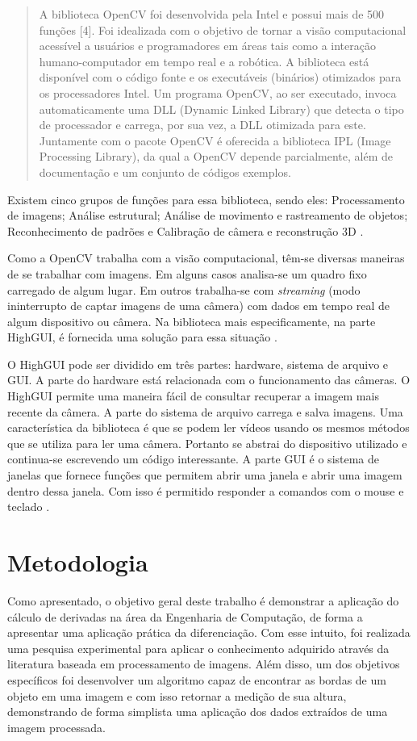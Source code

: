 \documentclass[12pt]{article}
\begin{document}
	\begin{quote}
		A biblioteca OpenCV foi desenvolvida pela Intel e possui mais de 500 funções [4]. Foi idealizada com o objetivo de tornar a visão computacional acessível a usuários e programadores em áreas tais como a interação humano-computador em tempo real e a robótica. A biblioteca está disponível com o código fonte e os executáveis (binários) otimizados para os processadores Intel. Um programa OpenCV, ao ser executado, invoca automaticamente uma DLL (Dynamic Linked Library) que detecta o tipo de processador e carrega, por sua vez, a DLL otimizada para este. Juntamente com o pacote OpenCV é oferecida a biblioteca IPL (Image Processing Library), da qual a OpenCV depende parcialmente, além de documentação e um conjunto de códigos exemplos. \citep{marengoni2009tutorial}
	\end{quote}
	
	Existem cinco grupos de funções para essa biblioteca, sendo eles: Processamento de imagens; Análise estrutural; Análise de movimento e rastreamento de objetos; Reconhecimento de padrões e Calibração de câmera e reconstrução 3D \citep{marengoni2009tutorial}.
	
	Como a OpenCV trabalha com a visão computacional, têm-se diversas maneiras de se trabalhar com imagens. Em alguns casos analisa-se um quadro fixo carregado de algum lugar. Em outros trabalha-se com \textit{streaming} (modo ininterrupto de captar imagens de uma câmera) com dados em tempo real de algum dispositivo ou câmera. Na biblioteca mais especificamente, na parte HighGUI, é fornecida uma solução para essa situação \citep{bradski2008learning}. 
	
	O HighGUI pode ser dividido em três partes: hardware, sistema de arquivo e GUI. A parte do hardware está relacionada com o funcionamento das câmeras. O HighGUI permite uma maneira fácil de consultar recuperar a imagem mais recente da câmera. A parte do sistema de arquivo carrega e salva imagens.  Uma característica da biblioteca é que se podem ler vídeos usando os mesmos métodos que se utiliza para ler uma câmera. Portanto se abstrai do dispositivo utilizado e continua-se escrevendo um código interessante. A parte GUI é o sistema de janelas que fornece funções que permitem abrir uma janela e abrir uma imagem dentro dessa janela. Com isso é permitido responder a comandos com o mouse e teclado \citep{bradski2008learning}.
	
	
	\section{Metodologia}
	Como apresentado, o objetivo geral deste trabalho é demonstrar a aplicação do cálculo de derivadas na área da Engenharia de Computação, de forma a apresentar uma aplicação prática da diferenciação. Com esse intuito, foi realizada uma pesquisa experimental para aplicar o conhecimento adquirido através da literatura baseada em processamento de imagens. Além disso, um dos objetivos específicos foi desenvolver um algoritmo capaz de encontrar as bordas de um objeto em uma imagem e com isso retornar a medição de sua altura, demonstrando de forma simplista uma aplicação dos dados extraídos de uma imagem processada.
	
\end{document}
